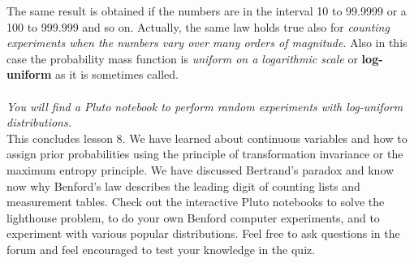 \documentclass[12pt, a4paper]{scrartcl}
\begin{document}
The same result is obtained if the numbers are in the interval 10 to 99.9999
or a 100 to 999.999 and so on.
Actually, the same law holds true also for \textit{counting experiments when the
numbers vary over many orders of magnitude}. Also in this case the probability mass function is \textit{uniform on a logarithmic scale} or  \textbf{log-uniform} as it is
sometimes called.\\

\\

\textit{You will find a Pluto notebook to perform random experiments with log-uniform distributions.}\\


This concludes lesson 8. We have learned about continuous variables and
how to assign prior probabilities using the principle of transformation invariance or the maximum entropy principle. We have discussed Bertrand's paradox and know now why Benford’s law
describes the leading digit of counting lists and measurement tables.
Check out the interactive Pluto notebooks to solve the lighthouse problem,
to do your own Benford computer experiments, and to experiment with
various popular distributions. Feel free to ask questions in the forum and feel encouraged to test your knowledge in the quiz.
\end{document}
